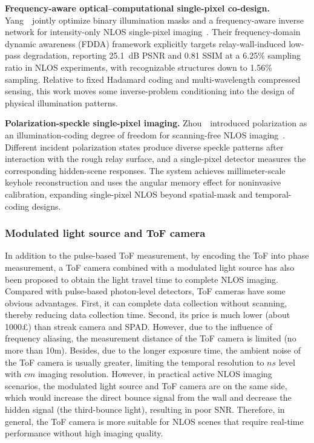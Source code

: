 \vspace{0.8mm}
\noindent \textbf{Frequency-aware optical--computational single-pixel co-design.}
Yang~\etal~jointly optimize binary illumination masks and a frequency-aware inverse network for intensity-only NLOS single-pixel imaging~\cite{yangFDDASinglePixelNLOS2026}. Their frequency-domain dynamic awareness (FDDA) framework explicitly targets relay-wall-induced low-pass degradation, reporting 25.1~dB PSNR and 0.81 SSIM at a 6.25\% sampling ratio in NLOS experiments, with recognizable structures down to 1.56\% sampling. Relative to fixed Hadamard coding and multi-wavelength compressed sensing, this work moves some inverse-problem conditioning into the design of physical illumination patterns.

\vspace{0.8mm}
\noindent \textbf{Polarization-speckle single-pixel imaging.}
Zhou~\etal~introduced polarization as an illumination-coding degree of freedom for scanning-free NLOS imaging~\cite{zhouPolarizationSpeckleNLOS2026}. Different incident polarization states produce diverse speckle patterns after interaction with the rough relay surface, and a single-pixel detector measures the corresponding hidden-scene responses. The system achieves millimeter-scale keyhole reconstruction and uses the angular memory effect for noninvasive calibration, expanding single-pixel NLOS beyond spatial-mask and temporal-coding designs.

\subsubsection{Modulated light source and ToF camera}
In addition to the pulse-based ToF measurement, by encoding the ToF into phase measurement, a ToF camera combined with a modulated light source has also been proposed to obtain the light travel time to complete NLOS imaging\cite{heideDiffuseMirrors3D2014,kadambiOccludedImagingTimeofflight2016}. Compared with pulse-based photon-level detectors, ToF cameras have some obvious advantages. First, it can complete data collection without scanning, thereby reducing data collection time. Second, its price is much lower (about 1000\pounds) than streak camera and SPAD. However, due to the influence of frequency aliasing, the measurement distance of the ToF camera is limited (no more than 10m). Besides, due to the longer exposure time, the ambient noise of the ToF camera is usually greater, limiting the temporal resolution to $ns$ level with $cm$ imaging resolution. 
However, in practical active NLOS imaging scenarios, the modulated light source and ToF camera are on the same side, which would increase the direct bounce signal from the wall and decrease the hidden signal (the third-bounce light), resulting in poor SNR. Therefore, in general, the ToF camera is more suitable for NLOS scenes that require real-time performance without high imaging quality.

